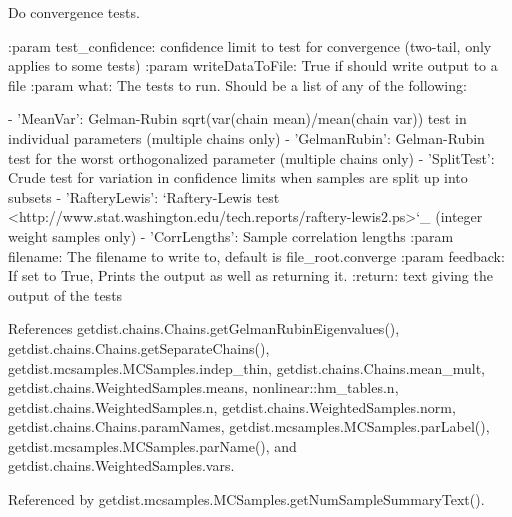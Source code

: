 \begin{DoxyVerb}Do convergence tests.

:param test_confidence: confidence limit to test for convergence (two-tail, only applies to some tests)
:param writeDataToFile: True if should write output to a file
:param what: The tests to run. Should be a list of any of the following:

    - 'MeanVar': Gelman-Rubin sqrt(var(chain mean)/mean(chain var)) test in individual parameters (multiple chains only)
    - 'GelmanRubin':  Gelman-Rubin test for the worst orthogonalized parameter (multiple chains only)
    - 'SplitTest': Crude test for variation in confidence limits when samples are split up into subsets
    - 'RafteryLewis': `Raftery-Lewis test <http://www.stat.washington.edu/tech.reports/raftery-lewis2.ps>`_ (integer weight samples only)
    - 'CorrLengths': Sample correlation lengths
:param filename: The filename to write to, default is file_root.converge
:param feedback: If set to True, Prints the output as well as returning it.
:return: text giving the output of the tests
\end{DoxyVerb}
 

References getdist.\+chains.\+Chains.\+get\+Gelman\+Rubin\+Eigenvalues(), getdist.\+chains.\+Chains.\+get\+Separate\+Chains(), getdist.\+mcsamples.\+M\+C\+Samples.\+indep\+\_\+thin, getdist.\+chains.\+Chains.\+mean\+\_\+mult, getdist.\+chains.\+Weighted\+Samples.\+means, nonlinear\+::hm\+\_\+tables.\+n, getdist.\+chains.\+Weighted\+Samples.\+n, getdist.\+chains.\+Weighted\+Samples.\+norm, getdist.\+chains.\+Chains.\+param\+Names, getdist.\+mcsamples.\+M\+C\+Samples.\+par\+Label(), getdist.\+mcsamples.\+M\+C\+Samples.\+par\+Name(), and getdist.\+chains.\+Weighted\+Samples.\+vars.



Referenced by getdist.\+mcsamples.\+M\+C\+Samples.\+get\+Num\+Sample\+Summary\+Text().

